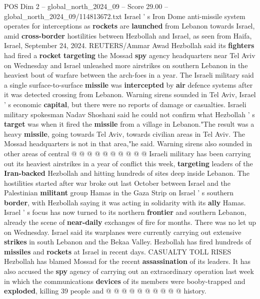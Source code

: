 \begin{textsample}{POS Dim 2 – global\_north\_2024\_09 – Score 29.00 – global\_north\_2024\_09/114813672.txt}  \label{ex:f2_pos_129}
Israel ' s Iron Dome anti-missile system operates for interceptions as \textbf{rockets} are \textbf{launched} from Lebanon towards Israel, amid \textbf{cross-border} hostilities between Hezbollah and Israel, as seen from Haifa, Israel, September 24, 2024.
REUTERS/Ammar Awad Hezbollah said its \textbf{fighters} had fired a \textbf{rocket} \textbf{targeting} the Mossad \textbf{spy} agency headquarters near Tel Aviv on Wednesday and Israel unleashed more airstrikes on southern Lebanon in the heaviest bout of warfare between the arch-foes in a year.
The Israeli military said a single surface-to-surface \textbf{missile} was \textbf{intercepted} by \textbf{air} defence systems after it was detected crossing from Lebanon.
Warning sirens sounded in Tel Aviv, Israel ' s economic \textbf{capital}, but there were no reports of damage or casualties.
Israeli military spokesman Nadav Shoshani said he could not confirm what Hezbollah ' s \textbf{target} was when it fired the \textbf{missile} from a village in Lebanon."The result was a heavy \textbf{missile}, going towards Tel Aviv, towards civilian areas in Tel Aviv.
The Mossad headquarters is not in that area,"he said.
Warning sirens also sounded in other areas of central @ @ @ @ @ @ @ @ @ @ Israeli military has been carrying out its heaviest airstrikes in a year of conflict this week, \textbf{targeting} leaders of the \textbf{Iran-backed} Hezbollah and hitting hundreds of sites deep inside Lebanon.
The hostilities started after war broke out last October between Israel and the Palestinian \textbf{militant} group Hamas in the Gaza Strip on Israel ' s southern \textbf{border}, with Hezbollah saying it was acting in solidarity with its \textbf{ally} Hamas.
Israel ' s focus has now turned to its northern \textbf{frontier} and southern Lebanon, already the scene of \textbf{near-daily} exchanges of fire for months.
There was no let up on Wednesday.
Israel said its warplanes were currently carrying out extensive \textbf{strikes} in south Lebanon and the Bekaa Valley.
Hezbollah has fired hundreds of \textbf{missiles} and \textbf{rockets} at Israel in recent days.
CASUALTY TOLL RISES Hezbollah has blamed Mossad for the recent \textbf{assassination} of its leaders.
It has also accused the \textbf{spy} agency of carrying out an extraordinary operation last week in which the communications \textbf{devices} of its members were booby-trapped and \textbf{exploded}, killing 39 people and @ @ @ @ @ @ @ @ @ @ history.

\end{textsample}
